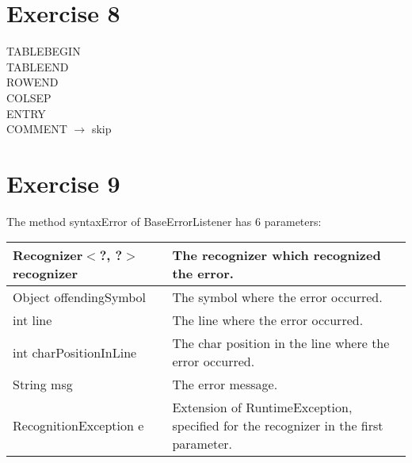\documentclass[11pt]{article} %
\begin{document}
\section*{Exercise 8}
TABLEBEGIN \\
TABLEEND \\
ROWEND \\
COLSEP \\
ENTRY \\
COMMENT $\rightarrow$ skip

\section*{Exercise 9}
The method syntaxError of BaseErrorListener has 6 parameters:\\

\begin{tabular}{|l|p{10cm}|}\hline
Recognizer$<$?, ?$>$ recognizer
& The recognizer which recognized the error. \\\hline

Object offendingSymbol
& The symbol where the error occurred. \\\hline

int line
& The line where the error occurred. \\\hline

int charPositionInLine
& The char position in the line where the error occurred. \\\hline

String msg
& The error message. \\\hline

RecognitionException e
& Extension of RuntimeException, specified for the recognizer in the first parameter. \\\hline
\end{tabular} \\
\end{document}
